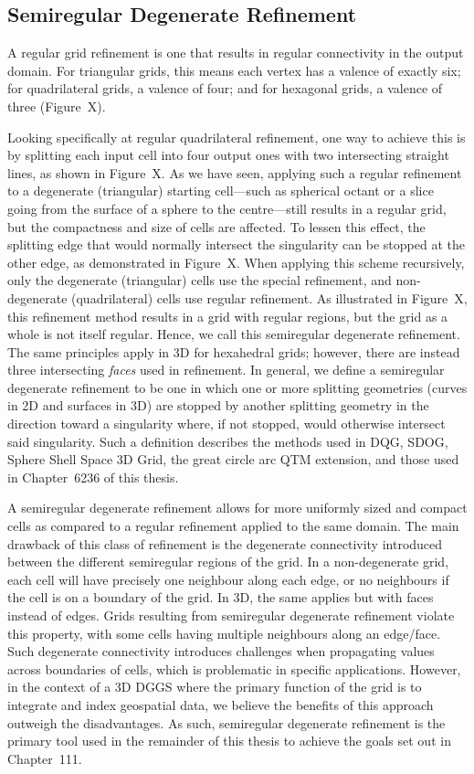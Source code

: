 \subsection{Semiregular Degenerate Refinement}
A regular grid refinement is one that results in regular connectivity in the output domain.
For triangular grids, this means each vertex has a valence of exactly six; for quadrilateral grids, a valence of four; and for hexagonal grids, a valence of three (Figure~X).


Looking specifically at regular quadrilateral refinement, one way to achieve this is by splitting each input cell into four output ones with two intersecting straight lines, as shown in Figure~X.
As we have seen, applying such a regular refinement to a degenerate (triangular) starting cell---such as spherical octant or a slice going from the surface of a sphere to the centre---still results in a regular grid, but the compactness and size of cells are affected.
To lessen this effect, the splitting edge that would normally intersect the singularity can be stopped at the other edge, as demonstrated in Figure~X.
When applying this scheme recursively, only the degenerate (triangular) cells use the special refinement, and non-degenerate (quadrilateral) cells use regular refinement.
As illustrated in Figure~X, this refinement method results in a grid with regular regions, but the grid as a whole is not itself regular.
Hence, we call this semiregular degenerate refinement.
The same principles apply in 3D for hexahedral grids; however, there are instead three intersecting \textit{faces} used in refinement.
In general, we define a semiregular degenerate refinement to be one in which one or more splitting geometries (curves in 2D and surfaces in 3D) are stopped by another splitting geometry in the direction toward a singularity where, if not stopped, would otherwise intersect said singularity.
Such a definition describes the methods used in DQG, SDOG, Sphere Shell Space 3D Grid, the great circle arc QTM extension, and those used in Chapter~6236 of this thesis.


A semiregular degenerate refinement allows for more uniformly sized and compact cells as compared to a regular refinement applied to the same domain.
The main drawback of this class of refinement is the degenerate connectivity introduced between the different semiregular regions of the grid.
In a non-degenerate grid, each cell will have precisely one neighbour along each edge, or no neighbours if the cell is on a boundary of the grid.
In 3D, the same applies but with faces instead of edges.
Grids resulting from semiregular degenerate refinement violate this property, with some cells having multiple neighbours along an edge/face.
Such degenerate connectivity introduces challenges when propagating values across boundaries of cells, which is problematic in specific applications.
However, in the context of a 3D DGGS where the primary function of the grid is to integrate and index geospatial data, we believe the benefits of this approach outweigh the disadvantages.
As such, semiregular degenerate refinement is the primary tool used in the remainder of this thesis to achieve the goals set out in Chapter~111.

